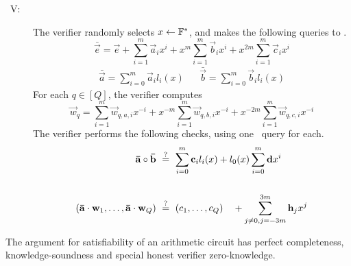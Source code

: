 \begin{description}
\item[\ V:] The verifier randomly selects $x\gets \mathbb{F}^*$, and makes the following queries to \ILC.
\[
\bar{\vec{e}} = \vec{e} + \sum_{i=1}^m \vec{a}_{i} x^i + x^m \sum_{i=1}^m \vec{b}_{i} x^i + x^{2m} \sum_{i=1}^m \vec{c}_{i} x^i
\]
\begin{align*}
\bar{\vec{a}} = \sum_{i=0}^m \vec{a}_{i} l_i(x) && \bar{\vec{b}} = \sum_{i=0}^m \vec{b}_{i} l_i(x)
\end{align*}
For each $q \in [Q]$, the verifier computes
\[
\vec{w}_q = \sum_{i=1}^m \vec{w}_{q,a,i} x^{-i} + x^{-m} \sum_{i=1}^m \vec{w}_{q,b,i} x^{-i} + x^{-2m} \sum_{i=1}^m \vec{w}_{q,c,i} x^{-i}
\]
The verifier performs the following checks, using one \ILCcheck\ query for each.
\begin{align*}
\mathbf{\bar{a}} \circ \mathbf{\bar{b}} ~&\overset{?}{=}~ \sum_{i=0}^m \mathbf{c}_{i} l_i(x) + l_0(x) \sum_{i=0}^m \mathbf{d} x^i \\ \\
\left(\mathbf{\bar{a}}\cdot \mathbf{w}_1,\ldots,\mathbf{\bar{a}}\cdot \mathbf{w}_Q \right) ~&\overset{?}{=}~ (c_1,\ldots,c_Q) \quad + \sum_{j\neq 0,j=-3m}^{3m} \mathbf{h}_j {x^j}
\end{align*}
\end{description}

\begin{thm}
The argument for satisfiability of an arithmetic circuit has perfect completeness, knowledge-soundness and special honest verifier zero-knowledge.
\end{thm}

